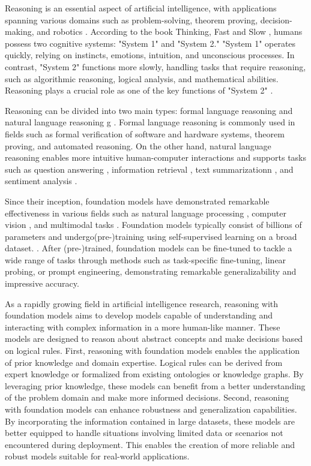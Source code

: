 Reasoning is an essential aspect of artificial intelligence, with applications 
spanning various domains such as problem-solving, theorem proving, 
decision-making, and robotics \cite{in1}. According to the book Thinking, 
Fast and Slow \cite{in2}, humans possess two cognitive systems: "System 1" 
and "System 2." "System 1" operates quickly, relying on instincts, emotions, 
intuition, and unconscious processes. In contrast, "System 2" functions more 
slowly, handling tasks that require reasoning, such as algorithmic reasoning, 
logical analysis, and mathematical abilities. Reasoning plays a crucial role 
as one of the key functions of "System 2" \cite{in3} \cite{in4}. 

Reasoning can be divided into two main types: formal language reasoning and 
natural language reasoning g \cite{in5} \cite{in6} \cite{in7} \cite{in8}. Formal language 
reasoning is commonly used in fields such as formal verification of software and hardware 
systems, theorem proving, and automated reasoning. On the other hand, natural language 
reasoning enables more intuitive human-computer interactions and supports tasks such as 
question answering \cite{in9}, information retrieval \cite{in10}, text summarizationn \cite{in11}, 
and sentiment analysis \cite{in12}.

Since their inception, foundation models \cite{in13}  have demonstrated 
remarkable effectiveness in various fields such as natural language processing \cite{in14}, 
computer vision \cite{in15}, and multimodal tasks \cite{in16}. Foundation models typically 
consist of billions of parameters and undergo(pre-)training using self-supervised learning 
on a broad dataset. . After (pre-)trained, foundation models can be fine-tuned to tackle a 
wide range of tasks through methods such as task-specific fine-tuning, linear probing, or 
prompt engineering, demonstrating remarkable generalizability and impressive accuracy.

As a rapidly growing field in artificial intelligence research, reasoning with 
foundation models aims to develop models capable of understanding and interacting 
with complex information in a more human-like manner. These models are designed to 
reason about abstract concepts and make decisions based on logical rules. First, 
reasoning with foundation models enables the application of prior knowledge and 
domain expertise. Logical rules can be derived from expert knowledge or formalized 
from existing ontologies or knowledge graphs. By leveraging prior knowledge, these 
models can benefit from a better understanding of the problem domain and make more 
informed decisions. Second, reasoning with foundation models can enhance robustness 
and generalization capabilities. By incorporating the information contained in large 
datasets, these models are better equipped to handle situations involving limited data 
or scenarios not encountered during deployment. This enables the creation of more 
reliable and robust models suitable for real-world applications.

